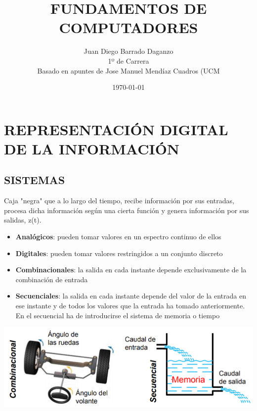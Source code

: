 \documentclass[a4paper,10pt]{book}
\title{FUNDAMENTOS DE COMPUTADORES}
\author{Juan Diego Barrado Daganzo\\1º de Carrera \\ Basado en apuntes de Jose Manuel Mendíaz Cuadros (UCM} %
\date{\today}
\begin{document}
\maketitle

\mainmatter
\chapter*{REPRESENTACIÓN DIGITAL DE LA INFORMACIÓN}
\section*{SISTEMAS}
Caja "negra" que a lo largo del tiempo, recibe información por sus entradas, procesa dicha información según una cierta función y genera información por sus salidas, z(t).

\begin{itemize}
\item \textbf{Analógicos}: pueden tomar valores en un espectro continuo de ellos
\item \textbf{Digitales}: pueden tomar valores restringidos a un conjunto discreto
\end{itemize}
\vspace{0.05cm}
\begin{itemize}
\item \textbf{Combinacionales}: la salida en cada instante depende exclusivamente de la combinación de entrada
\item \textbf{Secuenciales}: la salida en cada instante depende del valor de la entrada en ese instante y de todos los valores que la entrada ha tomado anteriormente. En el secuencial ha de introducirse el sistema de memoria o tiempo
\end{itemize}

\begin{center}
\includegraphics[scale=0.45]{secuencial y combinacional}
\end{center}
\end{document}
